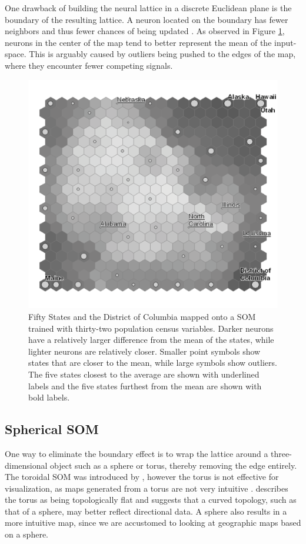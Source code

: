 \documentclass[10pt,titlepage]{article}
\begin{document}
One drawback of building the neural lattice in a discrete Euclidean plane is the
boundary of the resulting lattice.  A neuron located on the boundary has fewer
neighbors and thus fewer chances of being updated \citep{wu2006}.  As observed
in Figure \ref{figure1}, neurons in the center of the map tend to better
represent the mean of the input-space.  This is arguably caused by outliers
being pushed to the edges of the map, where they encounter fewer competing
signals.

\begin{figure}
\centering
\includegraphics[width=\linewidth]{gridedge_grey.pdf}
\caption{Fifty States and the District of Columbia mapped onto a
SOM trained with thirty-two population census variables.  Darker neurons have a
relatively larger difference from the mean of the states, while lighter
neurons are relatively closer.  Smaller point symbols show states that are closer to the
mean, while large symbols show outliers. The five states closest to the average are shown
with underlined labels and the five states furthest from the mean are shown with
bold labels.}
\label{figure1}
\end{figure}


\subsection{Spherical SOM}
One way to eliminate the boundary effect is to wrap the lattice around a
three-dimensional object such as a sphere or torus, thereby removing the edge
entirely. The toroidal SOM was introduced by \cite{li1993}, however the torus is
not effective for visualization, as maps generated from a torus are not
very intuitive \citep{ito2000,wu2006}.  \cite{ritter99} describes the torus as
being topologically flat and suggests that a curved topology, such as that of a
sphere, may better reflect directional data.  A sphere also results in a more
intuitive map, since we are accustomed to looking at geographic maps based on a sphere.
\end{document}
